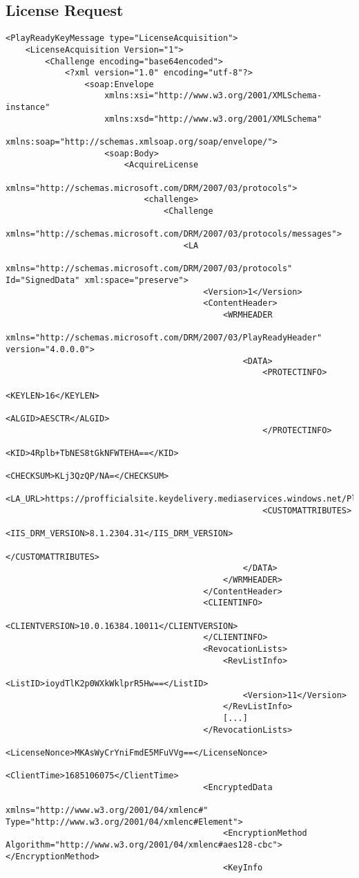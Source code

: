 \documentclass[11pt, a4paper]{IEEEtran}
\begin{document}
\newpage
\onecolumn
\begin{appendices}

\section{License Request} \label{appendix:licenserequest}

\lstset{tabsize=1}
\begin{lstlisting}[breaklines, caption={Sample License Request message},mathescape]
<PlayReadyKeyMessage type="LicenseAcquisition">
	<LicenseAcquisition Version="1">
		<Challenge encoding="base64encoded">
			<?xml version="1.0" encoding="utf-8"?>
				<soap:Envelope
					xmlns:xsi="http://www.w3.org/2001/XMLSchema-instance"
					xmlns:xsd="http://www.w3.org/2001/XMLSchema"
					xmlns:soap="http://schemas.xmlsoap.org/soap/envelope/">
					<soap:Body>
						<AcquireLicense
							xmlns="http://schemas.microsoft.com/DRM/2007/03/protocols">
							<challenge>
								<Challenge
									xmlns="http://schemas.microsoft.com/DRM/2007/03/protocols/messages">
									<LA
										xmlns="http://schemas.microsoft.com/DRM/2007/03/protocols" Id="SignedData" xml:space="preserve">
										<Version>1</Version>
										<ContentHeader>
											<WRMHEADER
												xmlns="http://schemas.microsoft.com/DRM/2007/03/PlayReadyHeader" version="4.0.0.0">
												<DATA>
													<PROTECTINFO>
														<KEYLEN>16</KEYLEN>
														<ALGID>AESCTR</ALGID>
													</PROTECTINFO>
													<KID>4Rplb+TbNES8tGkNFWTEHA==</KID>
													<CHECKSUM>KLj3QzQP/NA=</CHECKSUM>
													<LA_URL>https://profficialsite.keydelivery.mediaservices.windows.net/PlayReady/</LA_URL>
													<CUSTOMATTRIBUTES>
														<IIS_DRM_VERSION>8.1.2304.31</IIS_DRM_VERSION>
													</CUSTOMATTRIBUTES>
												</DATA>
											</WRMHEADER>
										</ContentHeader>
										<CLIENTINFO>
											<CLIENTVERSION>10.0.16384.10011</CLIENTVERSION>
										</CLIENTINFO>
										<RevocationLists>
											<RevListInfo>
												<ListID>ioydTlK2p0WXkWklprR5Hw==</ListID>
												<Version>11</Version>
											</RevListInfo>
											[...]
										</RevocationLists>
										<LicenseNonce>MKAsWyCrYniFmdE5MFuVVg==</LicenseNonce>
										<ClientTime>1685106075</ClientTime>
										<EncryptedData
											xmlns="http://www.w3.org/2001/04/xmlenc#" Type="http://www.w3.org/2001/04/xmlenc#Element">
											<EncryptionMethod Algorithm="http://www.w3.org/2001/04/xmlenc#aes128-cbc"></EncryptionMethod>
											<KeyInfo

\end{lstlisting}
\end{appendices}
\end{document}
